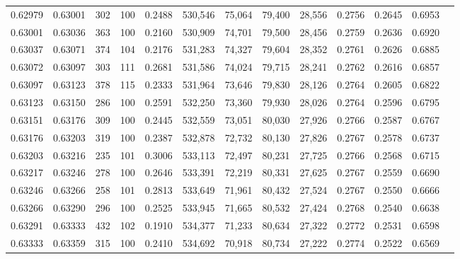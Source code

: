 \begin{tabular}{rrrrrrrrrrrrr}
0.62979 & 0.63001 &   302 & 100 &                                     0.2488 & 530,546 &  75,064 &  79,400 &  28,556 & 0.2756 & 0.2645 & 0.6953 \\
0.63001 & 0.63036 &   363 & 100 &                                     0.2160 & 530,909 &  74,701 &  79,500 &  28,456 & 0.2759 & 0.2636 & 0.6920 \\
0.63037 & 0.63071 &   374 & 104 &                                     0.2176 & 531,283 &  74,327 &  79,604 &  28,352 & 0.2761 & 0.2626 & 0.6885 \\
0.63072 & 0.63097 &   303 & 111 &                                     0.2681 & 531,586 &  74,024 &  79,715 &  28,241 & 0.2762 & 0.2616 & 0.6857 \\
0.63097 & 0.63123 &   378 & 115 &                                     0.2333 & 531,964 &  73,646 &  79,830 &  28,126 & 0.2764 & 0.2605 & 0.6822 \\
0.63123 & 0.63150 &   286 & 100 &                                     0.2591 & 532,250 &  73,360 &  79,930 &  28,026 & 0.2764 & 0.2596 & 0.6795 \\
0.63151 & 0.63176 &   309 & 100 &                                     0.2445 & 532,559 &  73,051 &  80,030 &  27,926 & 0.2766 & 0.2587 & 0.6767 \\
0.63176 & 0.63203 &   319 & 100 &                                     0.2387 & 532,878 &  72,732 &  80,130 &  27,826 & 0.2767 & 0.2578 & 0.6737 \\
0.63203 & 0.63216 &   235 & 101 &                                     0.3006 & 533,113 &  72,497 &  80,231 &  27,725 & 0.2766 & 0.2568 & 0.6715 \\
0.63217 & 0.63246 &   278 & 100 &                                     0.2646 & 533,391 &  72,219 &  80,331 &  27,625 & 0.2767 & 0.2559 & 0.6690 \\
0.63246 & 0.63266 &   258 & 101 &                                     0.2813 & 533,649 &  71,961 &  80,432 &  27,524 & 0.2767 & 0.2550 & 0.6666 \\
0.63266 & 0.63290 &   296 & 100 &                                     0.2525 & 533,945 &  71,665 &  80,532 &  27,424 & 0.2768 & 0.2540 & 0.6638 \\
0.63291 & 0.63333 &   432 & 102 &                                     0.1910 & 534,377 &  71,233 &  80,634 &  27,322 & 0.2772 & 0.2531 & 0.6598 \\
0.63333 & 0.63359 &   315 & 100 &                                     0.2410 & 534,692 &  70,918 &  80,734 &  27,222 & 0.2774 & 0.2522 & 0.6569 \\

\end{tabular}

